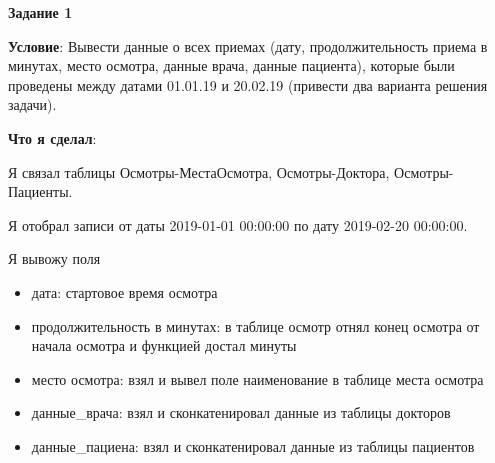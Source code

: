 











\begin{center}
\textbf{Задание 1}
\end{center}

\textbf{Условие}:
Вывести данные о всех приемах (дату, продолжительность приема в минутах, место
осмотра, данные врача, данные пациента), которые были проведены между датами
01.01.19 и 20.02.19 (привести два варианта решения задачи).

\textbf{Что я сделал}:

Я связал таблицы Осмотры-МестаОсмотра, Осмотры-Доктора, Осмотры-Пациенты.

Я отобрал записи от даты 2019-01-01 00:00:00 по дату 2019-02-20 00:00:00.

Я вывожу поля
\begin{itemize}
  \item дата: стартовое время осмотра
  \item продолжительность в минутах: в таблице осмотр отнял конец осмотра от начала осмотра и функцией достал минуты
  \item место осмотра: взял и вывел поле наименование в таблице места осмотра
  \item данные\_врача: взял и сконкатенировал данные из таблицы докторов
  \item данные\_пациена: взял и сконкатенировал данные из таблицы пациентов
\end{itemize}

